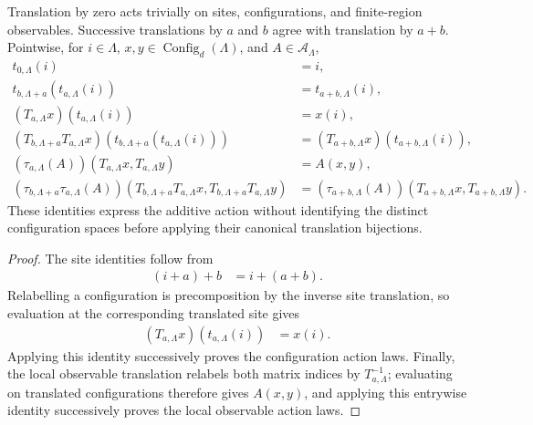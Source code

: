 \begin{lemma}
    \label{lem:qca_finite_translation_action}
    \leanok
    Translation by zero acts trivially on sites, configurations, and
    finite-region observables. Successive translations by $a$ and $b$ agree
    with translation by $a+b$. Pointwise, for $i\in\Lambda$,
    $x,y\in\operatorname{Config}_d(\Lambda)$, and
    $A\in\mathcal A_\Lambda$,
    \begin{align}
        t_{0,\Lambda}(i)                   & =i,                                      \\
        t_{b,\Lambda+a}(t_{a,\Lambda}(i))
                                           & =t_{a+b,\Lambda}(i),                     \\
        (T_{a,\Lambda}x)(t_{a,\Lambda}(i)) & =x(i),                                   \\
        (T_{b,\Lambda+a}T_{a,\Lambda}x)
        (t_{b,\Lambda+a}(t_{a,\Lambda}(i)))
                                           & =(T_{a+b,\Lambda}x)(t_{a+b,\Lambda}(i)), \\
        (\tau_{a,\Lambda}(A))(T_{a,\Lambda}x,T_{a,\Lambda}y)
                                           & =A(x,y),                                 \\
        (\tau_{b,\Lambda+a}\tau_{a,\Lambda}(A))
        (T_{b,\Lambda+a}T_{a,\Lambda}x,
        T_{b,\Lambda+a}T_{a,\Lambda}y)
                                           & =(\tau_{a+b,\Lambda}(A))
        (T_{a+b,\Lambda}x,T_{a+b,\Lambda}y).
    \end{align}
    These identities express the additive action without identifying the
    distinct configuration spaces before applying their canonical translation
    bijections.
\end{lemma}

\begin{proof}\leanok
    The site identities follow from
    \begin{align}
        (i+a)+b & =i+(a+b).
    \end{align}
    Relabelling a configuration is precomposition by the inverse site
    translation, so evaluation at the corresponding translated site gives
    \begin{align}
        (T_{a,\Lambda}x)(t_{a,\Lambda}(i)) & =x(i).
    \end{align}
    Applying this identity successively proves the configuration action laws.
    Finally, the local observable translation relabels both matrix indices by
    $T_{a,\Lambda}^{-1}$; evaluating on translated configurations therefore
    gives $A(x,y)$, and applying this entrywise identity successively proves the
    local observable action laws.
\end{proof}

